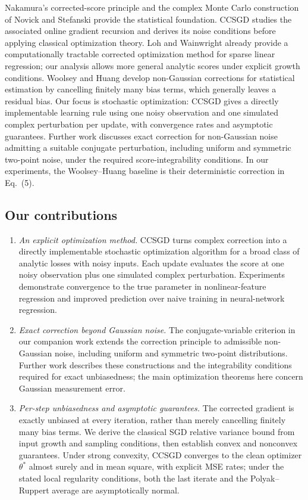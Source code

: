 Nakamura's corrected-score principle and the complex Monte Carlo
construction of Novick and Stefanski \cite{nakamura1990,novick2002}
provide the statistical foundation. CCSGD studies the associated online
gradient recursion and derives its noise conditions before applying
classical optimization theory. Loh and Wainwright
\cite{lohwainwright2012} already provide a computationally tractable
corrected optimization method for sparse linear regression; our analysis
allows more general analytic scores under explicit growth conditions.
Woolsey and Huang \cite{woolseyhuang2026} develop non-Gaussian
corrections for statistical estimation by cancelling finitely many bias
terms, which generally leaves a residual bias. Our focus is stochastic
optimization: CCSGD gives a directly implementable learning rule using
one noisy observation and one simulated complex perturbation per update,
with convergence rates and asymptotic guarantees. Further work discusses
exact correction for non-Gaussian noise admitting a suitable conjugate
perturbation, including uniform and symmetric two-point noise, under the
required score-integrability conditions. In our experiments, the
Woolsey--Huang baseline is their deterministic correction in Eq.~(5).

\subsection*{Our contributions}
\begin{enumerate}
\item \emph{An explicit optimization method.}
CCSGD turns complex correction into a directly implementable stochastic
optimization algorithm for a broad class of analytic losses with noisy
inputs. Each update evaluates the score at one noisy observation plus
one simulated complex perturbation. Experiments demonstrate convergence
to the true parameter in nonlinear-feature regression and improved
prediction over naive training in neural-network regression.
\item \emph{Exact correction beyond Gaussian noise.}
The conjugate-variable criterion in our companion work
\cite{conjugatecriterion2026} extends the correction principle to
admissible non-Gaussian noise, including uniform and symmetric two-point
distributions. Further work describes these constructions and the
integrability conditions required for exact unbiasedness; the main
optimization theorems here concern Gaussian measurement error.
\item \emph{Per-step unbiasedness and asymptotic guarantees.}
The corrected gradient is exactly unbiased at every iteration, rather
than merely cancelling finitely many bias terms. We derive the classical
SGD relative variance bound from input growth and sampling conditions,
then establish convex and nonconvex guarantees. Under strong convexity,
CCSGD converges to the clean optimizer $\theta^*$ almost surely and in
mean square, with explicit MSE rates; under the stated local regularity
conditions, both the last iterate and the Polyak--Ruppert average are
asymptotically normal.
\end{enumerate}

